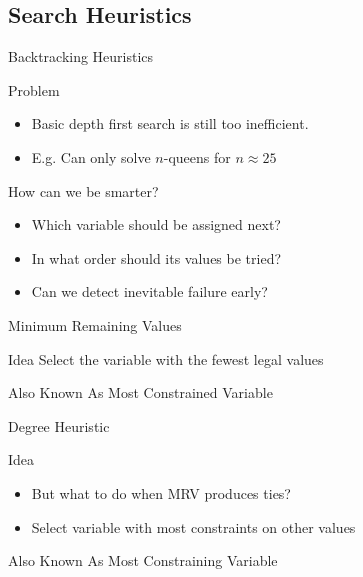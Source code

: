 \documentclass[14pt]{beamer}
\begin{document}
\subsection{Search Heuristics}
\begin{frame}{Backtracking Heuristics}
	\begin{block}{Problem}
		\begin{itemize}
			\item Basic depth first search is still too inefficient.
			\item E.g. Can only solve $n$-queens for $n \approx 25$
		\end{itemize}
	\end{block}
	\begin{block}{How can we be smarter?}
		\begin{itemize}
			\pause
			\item Which variable should be assigned next?
			\pause
			\item In what order should its values be tried?
			\pause
			\item Can we detect inevitable failure early?
		\end{itemize}
	\end{block}
\end{frame}
\begin{frame}{Minimum Remaining Values}
	\begin{block}{Idea}
		Select the variable with the fewest legal values \\
	\end{block}
	\pause
	\begin{center}
	\end{center}
	\pause
	\begin{block}{Also Known As}
		Most Constrained Variable
	\end{block}
\end{frame}
\begin{frame}{Degree Heuristic}
	\begin{block}{Idea}
		\begin{itemize}
			\item But what to do when MRV produces ties?
			\item Select variable with most constraints on other values
		\end{itemize}
	\end{block}
	\pause
	\begin{center}
	\end{center}
	\pause
	\begin{block}{Also Known As}
		Most Constraining Variable
	\end{block}
\end{frame}
\end{document}
